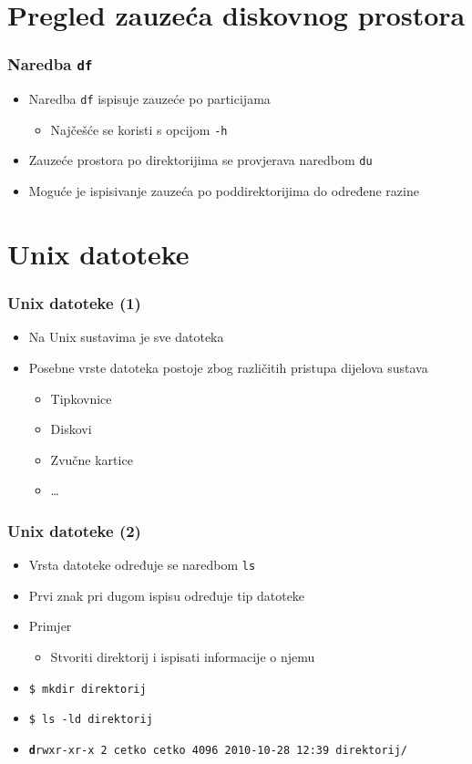 \documentclass{beamer}
\newcommand{\shell}[1]{\texttt{\small #1}}
\begin{document}
\section{Pregled zauzeća diskovnog prostora}
\begin{frame}[t]
\frametitle{Naredba \texttt{df}}
\begin{itemize}
  \item Naredba \texttt{df} ispisuje zauzeće po particijama
  \begin{itemize}
    \item Najčešće se koristi s opcijom \texttt{-h}
  \end{itemize}
  \item Zauzeće prostora po direktorijima se provjerava naredbom
        \texttt{du}
  \item Moguće je ispisivanje zauzeća po poddirektorijima do određene
        razine
\end{itemize}
\end{frame}

\section{Unix datoteke}
\begin{frame}[t]
\frametitle{Unix datoteke (1)}
\begin{itemize}
  \item Na Unix sustavima je sve datoteka
  \item Posebne vrste datoteka postoje zbog različitih pristupa dijelova
        sustava
  \begin{itemize}
    \item Tipkovnice
    \item Diskovi
    \item Zvučne kartice
    \item \ldots
  \end{itemize}
\end{itemize}
\end{frame}

\begin{frame}[t]
\frametitle{Unix datoteke (2)}
\begin{itemize}
  \item Vrsta datoteke određuje se naredbom \shell{ls}
  \item Prvi znak pri dugom ispisu određuje tip datoteke
  \item Primjer
  \begin{itemize}
    \item Stvoriti direktorij i ispisati informacije o njemu
  \end{itemize}
  \item[] \shell{\$ mkdir direktorij}
  \item[] \shell{\$ ls -ld direktorij}
  \item[] \shell{\footnotesize\textbf{d}rwxr-xr-x 2 cetko cetko 4096
                          2010-10-28 12:39 direktorij/}
\end{itemize}
\end{frame}
\end{document}
